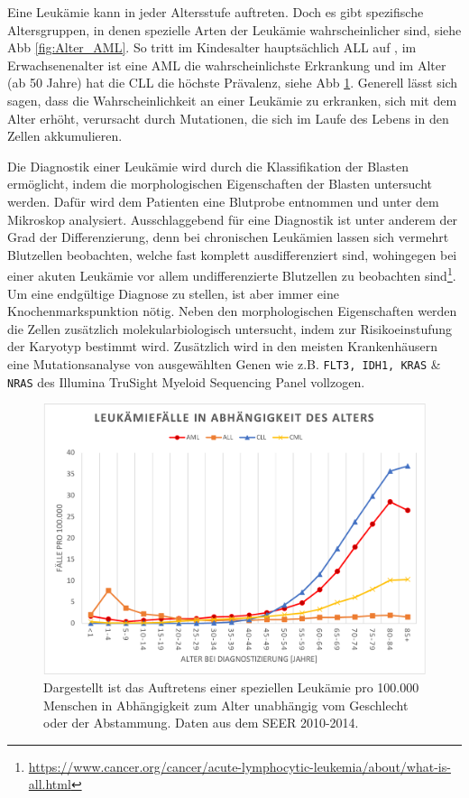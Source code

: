 Eine Leukämie kann in jeder Altersstufe auftreten. Doch es gibt spezifische Altersgruppen, in denen spezielle Arten der Leukämie wahrscheinlicher sind, siehe \ac{Abb} \ref{fig:Alter_AML}. So tritt im Kindesalter hauptsächlich \ac{ALL} auf \cite{Rubnitz.2012}, im Erwachsenenalter ist eine \ac{AML} die wahrscheinlichste Erkrankung und im Alter (ab 50 Jahre) hat die \ac{CLL} die höchste Prävalenz, siehe \ac{Abb} \ref{fig:Alter_AML_ALL_CLL_CML}. Generell lässt sich sagen, dass die Wahrscheinlichkeit an einer Leukämie zu erkranken, sich mit dem Alter erhöht, verursacht durch Mutationen, die sich im Laufe des Lebens in den Zellen akkumulieren.

Die Diagnostik einer Leukämie wird durch die Klassifikation der Blasten ermöglicht, indem die morphologischen Eigenschaften der Blasten untersucht werden. Dafür wird dem Patienten eine Blutprobe entnommen und unter dem Mikroskop analysiert. Ausschlaggebend für eine Diagnostik ist unter anderem der Grad der Differenzierung, denn bei chronischen Leukämien lassen sich vermehrt Blutzellen beobachten, welche fast komplett ausdifferenziert sind, wohingegen bei einer akuten Leukämie vor allem undifferenzierte Blutzellen zu beobachten sind\footnote{\url{https://www.cancer.org/cancer/acute-lymphocytic-leukemia/about/what-is-all.html}}. Um eine endgültige Diagnose zu stellen, ist aber immer eine Knochenmarkspunktion nötig. Neben den morphologischen Eigenschaften werden die Zellen zusätzlich molekularbiologisch untersucht, indem zur Risikoeinstufung der Karyotyp bestimmt wird. Zusätzlich wird in den meisten Krankenhäusern eine Mutationsanalyse von ausgewählten Genen wie z.B. \texttt{FLT3, IDH1, KRAS} \& \texttt{NRAS} des Illumina TruSight Myeloid Sequencing Panel vollzogen.


\begin{figure}
\centering
\includegraphics[width=.99\textwidth]{images/Alter_AML_ALL_CLL_CML.pdf}
\caption{Dargestellt ist das Auftretens einer speziellen Leukämie pro 100.000 Menschen in Abhängigkeit zum Alter unabhängig vom Geschlecht oder der Abstammung. Daten aus dem SEER 2010-2014.}
\label{fig:Alter_AML_ALL_CLL_CML}
\end{figure}

